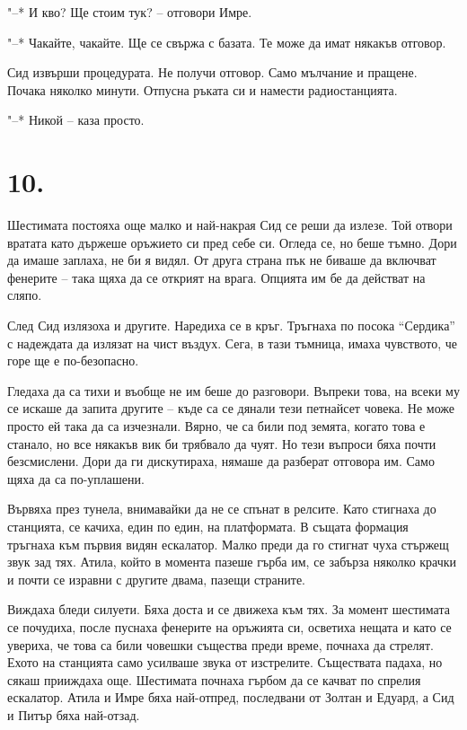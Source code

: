 \documentclass[ebook,openany,12pt]{memoir}
\begin{document}
"--* И кво? Ще стоим тук? – отговори Имре.

"--* Чакайте, чакайте. Ще се свържа с базата. Те може да имат някакъв отговор.

Сид извърши процедурата. Не получи отговор. Само мълчание и пращене. Почака няколко минути. Отпусна ръката си и намести радиостанцията.

"--* Никой – каза просто.

\section*{10.}

Шестимата постояха още малко и най-накрая Сид се реши да излезе. Той отвори вратата като държеше оръжието си пред себе си. Огледа се, но беше тъмно. Дори да имаше заплаха, не би я видял. От друга страна пък не биваше да включват фенерите – така щяха да се открият на врага. Опцията им бе да действат на сляпо.

След Сид излязоха и другите. Наредиха се в кръг. Тръгнаха по посока ``Сердика'' с надеждата да излязат на чист въздух. Сега, в тази тъмница, имаха чувството, че горе ще е по-безопасно.

Гледаха да са тихи и въобще не им беше до разговори. Въпреки това, на всеки му се искаше да запита другите – къде са се дянали тези петнайсет човека. Не може просто ей така да са изчезнали. Вярно, че са били под земята, когато това е станало, но все някакъв вик би трябвало да чуят. Но тези въпроси бяха почти безсмислени. Дори да ги дискутираха, нямаше да разберат отговора им. Само щяха да са по-уплашени.

Вървяха през тунела, внимавайки да не се спънат в релсите. Като стигнаха до станцията, се качиха, един по един, на платформата. В същата формация тръгнаха към първия видян ескалатор. Малко преди да го стигнат чуха стържещ звук зад тях. Атила, който в момента пазеше гърба им, се забърза няколко крачки и почти се изравни с другите двама, пазещи страните.

Виждаха бледи силуети. Бяха доста и се движеха към тях. За момент шестимата се почудиха, после пуснаха фенерите на оръжията си, осветиха нещата и като се увериха, че това са били човешки същества преди време, почнаха да стрелят. Ехото на станцията само усилваше звука от изстрелите. Съществата падаха, но сякаш прииждаха още. Шестимата почнаха гърбом да се качват по спрелия ескалатор. Атила и Имре бяха най-отпред, последвани от Золтан и Едуард, а Сид и Питър бяха най-отзад.
\end{document}

